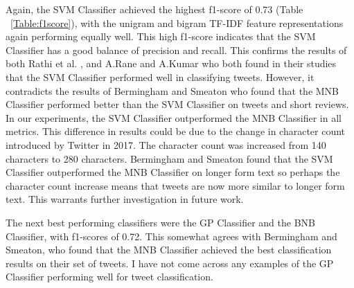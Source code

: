 Again, the SVM Classifier achieved the highest f1-score of 0.73 (Table ~\ref{Table:f1score}), with the unigram and bigram TF-IDF feature representations again performing equally well. This high f1-score indicates that the SVM Classifier has a good balance of precision and recall. This confirms the results of both Rathi et al. \cite{Raithi2018}, and A.Rane and A.Kumar \cite{Rane2018} who both found in their studies that the SVM Classifier performed well in classifying tweets. However, it contradicts the results of Bermingham and Smeaton \cite{Berm2010} who found that the MNB Classifier performed better than the SVM Classifier on tweets and short reviews. In our experiments, the SVM Classifier outperformed the MNB Classifier in all metrics. This difference in results could be due to the change in character count introduced by Twitter in 2017. The character count was increased from 140 characters to 280 characters. Bermingham and Smeaton \cite{Berm2010} found that the SVM Classifier outperformed the MNB Classifier on longer form text so perhaps the character count increase means that tweets are now more similar to longer form text. This warrants further investigation in future work.

The next best performing classifiers were the GP Classifier and the BNB Classifier, with f1-scores of 0.72. This somewhat agrees with Bermingham and Smeaton, who found that the MNB Classifier achieved the best classification results on their set of tweets. I have not come across any examples of the GP Classifier performing well for tweet classification.

